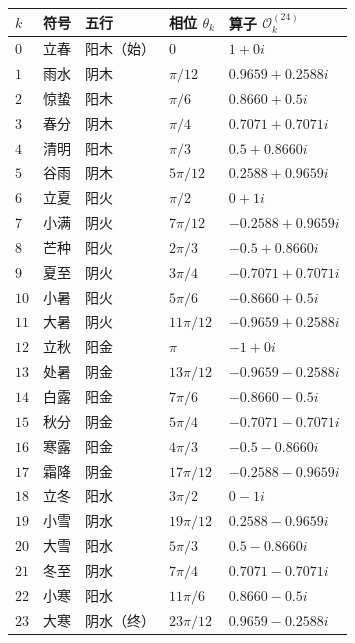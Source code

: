 \begin{center}
\begin{tabular}{>{\centering\arraybackslash}p{1cm}>{\centering\arraybackslash}p{1.5cm}>{\centering\arraybackslash}p{1.5cm}>{\centering\arraybackslash}p{2cm}>{\centering\arraybackslash}p{3.5cm}}
\toprule
$k$ & 符号 & 五行 & 相位 $\theta_k$ & 算子 $\mathcal{O}_k^{(24)}$ \\
\midrule
$0$ & 立春 & 阳木（始） & $0$ & $1+0i$ \\
$1$ & 雨水 & 阴木 & $\pi/12$ & $0.9659+0.2588i$ \\
$2$ & 惊蛰 & 阳木 & $\pi/6$ & $0.8660+0.5i$ \\
$3$ & 春分 & 阴木 & $\pi/4$ & $0.7071+0.7071i$ \\
$4$ & 清明 & 阳木 & $\pi/3$ & $0.5+0.8660i$ \\
$5$ & 谷雨 & 阴木 & $5\pi/12$ & $0.2588+0.9659i$ \\
$6$ & 立夏 & 阳火 & $\pi/2$ & $0+1i$ \\
$7$ & 小满 & 阴火 & $7\pi/12$ & $-0.2588+0.9659i$ \\
$8$ & 芒种 & 阳火 & $2\pi/3$ & $-0.5+0.8660i$ \\
$9$ & 夏至 & 阴火 & $3\pi/4$ & $-0.7071+0.7071i$ \\
$10$ & 小暑 & 阳火 & $5\pi/6$ & $-0.8660+0.5i$ \\
$11$ & 大暑 & 阴火 & $11\pi/12$ & $-0.9659+0.2588i$ \\
$12$ & 立秋 & 阳金 & $\pi$ & $-1+0i$ \\
$13$ & 处暑 & 阴金 & $13\pi/12$ & $-0.9659-0.2588i$ \\
$14$ & 白露 & 阳金 & $7\pi/6$ & $-0.8660-0.5i$ \\
$15$ & 秋分 & 阴金 & $5\pi/4$ & $-0.7071-0.7071i$ \\
$16$ & 寒露 & 阳金 & $4\pi/3$ & $-0.5-0.8660i$ \\
$17$ & 霜降 & 阴金 & $17\pi/12$ & $-0.2588-0.9659i$ \\
$18$ & 立冬 & 阳水 & $3\pi/2$ & $0-1i$ \\
$19$ & 小雪 & 阴水 & $19\pi/12$ & $0.2588-0.9659i$ \\
$20$ & 大雪 & 阳水 & $5\pi/3$ & $0.5-0.8660i$ \\
$21$ & 冬至 & 阴水 & $7\pi/4$ & $0.7071-0.7071i$ \\
$22$ & 小寒 & 阳水 & $11\pi/6$ & $0.8660-0.5i$ \\
$23$ & 大寒 & 阴水（终） & $23\pi/12$ & $0.9659-0.2588i$ \\
\bottomrule
\end{tabular}
\end{center}

